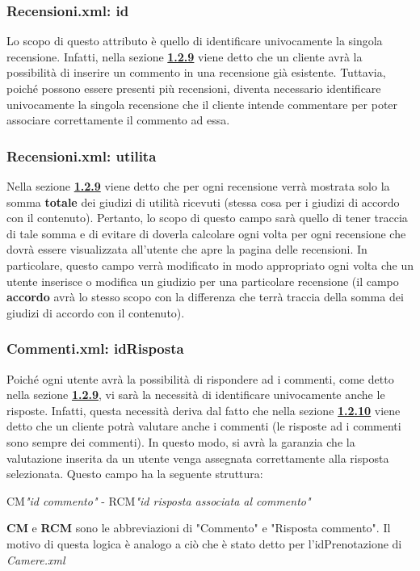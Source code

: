 \documentclass [a4paper, 12pt]{book}
\begin{document}
\subsubsection{Recensioni.xml: id}
Lo scopo di questo attributo è quello di identificare univocamente la singola recensione. Infatti, nella sezione \hyperref[Recensioni]{\textbf{1.2.9}} viene detto che un cliente avrà la possibilità di inserire un commento in una recensione già esistente. Tuttavia, poiché possono essere presenti più recensioni, diventa necessario identificare univocamente la singola recensione che il cliente intende commentare per poter associare correttamente il commento ad essa.

\subsubsection{Recensioni.xml: utilita}
Nella sezione \hyperref[Recensioni]{\textbf{1.2.9}} viene detto che per ogni recensione verrà mostrata solo la somma \textbf{totale} dei giudizi di utilità ricevuti (stessa cosa per i giudizi di accordo con il contenuto). Pertanto, lo scopo di questo campo sarà quello di tener traccia di tale somma e di evitare di doverla calcolare ogni volta per ogni recensione che dovrà essere visualizzata all'utente che apre la pagina delle recensioni. In particolare, questo campo verrà modificato in modo appropriato ogni volta che un utente inserisce o modifica un giudizio per una particolare recensione (il campo \textbf{accordo} avrà lo stesso scopo con la differenza che terrà traccia della somma dei giudizi di accordo con il contenuto).

\subsubsection{Commenti.xml: idRisposta}
Poiché ogni utente avrà la possibilità di rispondere ad i commenti, come detto nella sezione \hyperref[Recensioni]{\textbf{1.2.9}}, vi sarà la necessità di identificare univocamente anche le risposte. Infatti, questa necessità deriva dal fatto che nella sezione \hyperref[ValutazioneRecensioni]{\textbf{1.2.10}} viene detto che un cliente potrà valutare anche i commenti (le risposte ad i commenti sono sempre dei commenti). In questo modo, si avrà la garanzia che la valutazione inserita da un utente venga assegnata correttamente alla risposta selezionata. Questo campo ha la seguente struttura:
\begin{center}
CM\textit{"id commento"} - RCM\textit{"id risposta associata al commento"}
\end{center}
\textbf{CM} e \textbf{RCM} sono le abbreviazioni di "Commento" e "Risposta commento".  Il motivo di questa logica è analogo a ciò che è stato detto per l'idPrenotazione di \textit{Camere.xml} 
\end{document}
